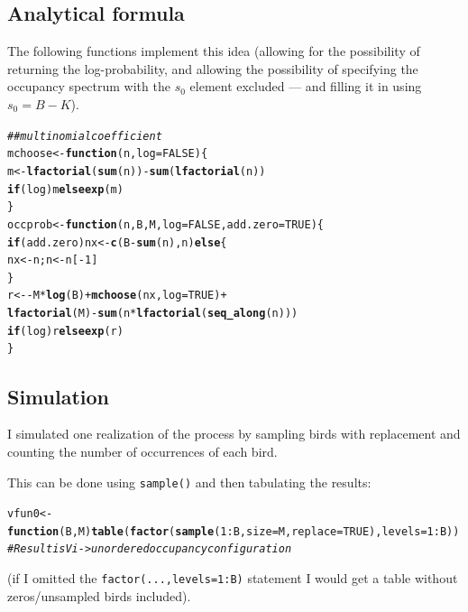 \documentclass{article}\usepackage[]{graphicx}\usepackage[]{color}
\makeatletter
\newcommand{\hlnum}[1]{\textcolor[rgb]{0.686,0.059,0.569}{#1}}%
\newcommand{\hlcom}[1]{\textcolor[rgb]{0.678,0.584,0.686}{\textit{#1}}}%
\newcommand{\hlopt}[1]{\textcolor[rgb]{0,0,0}{#1}}%
\newcommand{\hlstd}[1]{\textcolor[rgb]{0.345,0.345,0.345}{#1}}%
\newcommand{\hlkwa}[1]{\textcolor[rgb]{0.161,0.373,0.58}{\textbf{#1}}}%
\newcommand{\hlkwb}[1]{\textcolor[rgb]{0.69,0.353,0.396}{#1}}%
\newcommand{\hlkwc}[1]{\textcolor[rgb]{0.333,0.667,0.333}{#1}}%
\newcommand{\hlkwd}[1]{\textcolor[rgb]{0.737,0.353,0.396}{\textbf{#1}}}%
\newenvironment{kframe}{%
 \def\at@end@of@kframe{}%
 \ifinner\ifhmode%
  \def\at@end@of@kframe{\end{minipage}}%
  \begin{minipage}{\columnwidth}%
 \fi\fi%
 \def\FrameCommand##1{\hskip\@totalleftmargin \hskip-\fboxsep
 \colorbox{shadecolor}{##1}\hskip-\fboxsep
     \hskip-\linewidth \hskip-\@totalleftmargin \hskip\columnwidth}%
 \MakeFramed {\advance\hsize-\width
   \@totalleftmargin\z@ \linewidth\hsize
   \@setminipage}}%
 {\par\unskip\endMakeFramed%
 \at@end@of@kframe}
\newenvironment{knitrout}{}{} %
\newcommand{\code}[1]{{\tt #1}}
\makeatother
\begin{document}
\subsection{Analytical formula}
The following functions implement this idea
(allowing for the possibility of returning
the log-probability, and allowing the possibility
of specifying the occupancy spectrum with the $s_0$
element excluded --- and filling it in using $s_0=B-K$).
\begin{knitrout}
\color{fgcolor}\begin{kframe}
\begin{alltt}
\hlcom{## multinomial coefficient}
\hlstd{mchoose} \hlkwb{<-} \hlkwa{function}\hlstd{(}\hlkwc{n}\hlstd{,}\hlkwc{log}\hlstd{=}\hlnum{FALSE}\hlstd{) \{}
    \hlstd{m} \hlkwb{<-} \hlkwd{lfactorial}\hlstd{(}\hlkwd{sum}\hlstd{(n))}\hlopt{-}\hlkwd{sum}\hlstd{(}\hlkwd{lfactorial}\hlstd{(n))}
    \hlkwa{if} \hlstd{(log) m} \hlkwa{else} \hlkwd{exp}\hlstd{(m)}
\hlstd{\}}
\hlstd{occprob} \hlkwb{<-} \hlkwa{function}\hlstd{(}\hlkwc{n}\hlstd{,}\hlkwc{B}\hlstd{,}\hlkwc{M}\hlstd{,}\hlkwc{log}\hlstd{=}\hlnum{FALSE}\hlstd{,}\hlkwc{add.zero}\hlstd{=}\hlnum{TRUE}\hlstd{) \{}
    \hlkwa{if} \hlstd{(add.zero) nx} \hlkwb{<-} \hlkwd{c}\hlstd{(B}\hlopt{-}\hlkwd{sum}\hlstd{(n),n)} \hlkwa{else} \hlstd{\{}
        \hlstd{nx} \hlkwb{<-} \hlstd{n; n} \hlkwb{<-} \hlstd{n[}\hlopt{-}\hlnum{1}\hlstd{]}
    \hlstd{\}}
    \hlstd{r} \hlkwb{<-} \hlopt{-}\hlstd{M}\hlopt{*}\hlkwd{log}\hlstd{(B)}\hlopt{+}\hlkwd{mchoose}\hlstd{(nx,}\hlkwc{log}\hlstd{=}\hlnum{TRUE}\hlstd{)}\hlopt{+}
        \hlkwd{lfactorial}\hlstd{(M)}\hlopt{-}\hlkwd{sum}\hlstd{(n}\hlopt{*}\hlkwd{lfactorial}\hlstd{(}\hlkwd{seq_along}\hlstd{(n)))}
    \hlkwa{if} \hlstd{(log) r} \hlkwa{else} \hlkwd{exp}\hlstd{(r)}
\hlstd{\}}
\end{alltt}
\end{kframe}
\end{knitrout}

\subsection{Simulation}
I simulated one realization of the process by
sampling birds with replacement and counting the number of occurrences
of each bird.

This can be done using \code{sample()} and then tabulating the results:
\begin{knitrout}
\color{fgcolor}\begin{kframe}
\begin{alltt}
\hlstd{vfun0} \hlkwb{<-} \hlkwa{function}\hlstd{(}\hlkwc{B}\hlstd{,}\hlkwc{M}\hlstd{)} \hlkwd{table}\hlstd{(}\hlkwd{factor}\hlstd{(}\hlkwd{sample}\hlstd{(}\hlnum{1}\hlopt{:}\hlstd{B,}\hlkwc{size}\hlstd{=M,}\hlkwc{replace}\hlstd{=}\hlnum{TRUE}\hlstd{),}\hlkwc{levels}\hlstd{=}\hlnum{1}\hlopt{:}\hlstd{B))}
\hlcom{#Result is Vi -> unordered occupancy configuration}
\end{alltt}
\end{kframe}
\end{knitrout}
(if I omitted the \code{factor(...,levels=1:B)} statement
I would get a table without zeros/unsampled birds included).
\end{document}
